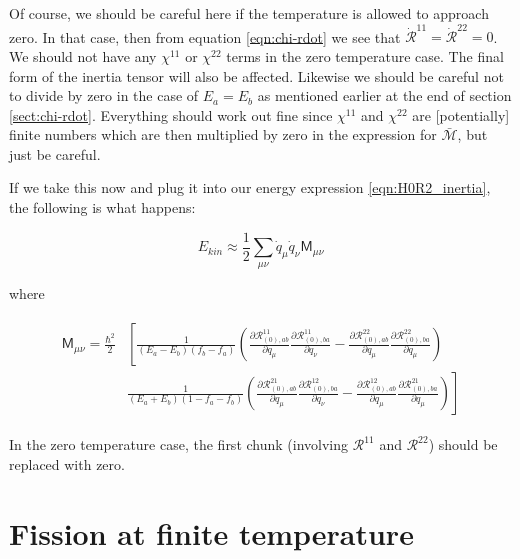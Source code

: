 \noindent Of course, we should be careful here if the temperature is allowed to approach zero. In that case, then from equation \ref{eqn:chi-rdot} we see that $\mathcal{\dot{R}}^{11}=\mathcal{\dot{R}}^{22}=0$. We should not have any $\chi^{11}$ or $\chi^{22}$ terms in the zero temperature case. The final form of the inertia tensor will also be affected. Likewise we should be careful not to divide by zero in the case of $E_a=E_b$ as mentioned earlier at the end of section \ref{sect:chi-rdot}. Everything should work out fine since $\chi^{11}$ and $\chi^{22}$ are [potentially] finite numbers which are then multiplied by zero in the expression for $\mathcal{\bar{M}}$, but just be careful.

If we take this now and plug it into our energy expression \ref{eqn:H0R2_inertia}, the following is what happens:

\begin{tcolorbox}
\begin{equation}
E_{kin} \approx \frac{1}{2}\sum_{\mu\nu}\dot{q}_\mu\dot{q}_\nu\mathsf{M}_{\mu\nu}
\end{equation}
\end{tcolorbox}

\noindent where

\begin{tcolorbox}
\begin{align}
\begin{aligned}
\mathsf{M}_{\mu\nu} =  \frac{\hbar^2}{2}&\left[\frac{1}{(E_a-E_b)(f_b-f_a)}\left(\frac{\partial\mathcal{R}^{11}_{(0),ab}}{\partial q_\mu}\frac{\partial\mathcal{R}^{11}_{(0),ba}}{\partial q_\nu}-\frac{\partial\mathcal{R}^{22}_{(0),ab}}{\partial q_\mu}\frac{\partial\mathcal{R}^{22}_{(0),ba}}{\partial q_\mu}\right)\right. \\
&\left.\frac{1}{(E_a+E_b)(1-f_a-f_b)}\left(\frac{\partial\mathcal{R}^{21}_{(0),ab}}{\partial q_\mu}\frac{\partial\mathcal{R}^{12}_{(0),ba}}{\partial q_\nu}-\frac{\partial\mathcal{R}^{12}_{(0),ab}}{\partial q_\mu}\frac{\partial\mathcal{R}^{21}_{(0),ba}}{\partial q_\mu}\right)\right]
\end{aligned}
\end{align}
\end{tcolorbox}

\noindent In the zero temperature case, the first chunk (involving $\mathcal{R}^{11}$ and $\mathcal{R}^{22}$) should be replaced with zero.

\section{Fission at finite temperature}

